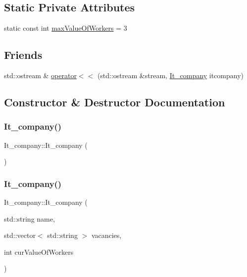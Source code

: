 \subsection*{Static Private Attributes}
\begin{DoxyCompactItemize}
\item 
static const int \hyperlink{class_it__company_ac71fd3642622747e9e543b5a193ba525}{max\+Value\+Of\+Workers} = 3
\end{DoxyCompactItemize}
\subsection*{Friends}
\begin{DoxyCompactItemize}
\item 
std\+::ostream \& \hyperlink{class_it__company_a962e1dda6d2c3075501e63a8d62693f7}{operator$<$$<$} (std\+::ostream \&stream, \hyperlink{class_it__company}{It\+\_\+company} itcompany)
\end{DoxyCompactItemize}


\subsection{Constructor \& Destructor Documentation}
\hypertarget{class_it__company_a586ce8103147bcb474965fbe92b029ae}{}\label{class_it__company_a586ce8103147bcb474965fbe92b029ae} 
\subsubsection{\texorpdfstring{It\+\_\+company()}{It\_company()}\hspace{0.1cm}{\footnotesize\ttfamily [1/3]}}
{\footnotesize\ttfamily It\+\_\+company\+::\+It\+\_\+company (\begin{DoxyParamCaption}{ }\end{DoxyParamCaption})\hspace{0.3cm}{\ttfamily [inline]}}

\hypertarget{class_it__company_aef3374e7fe0caae3e395e18418200112}{}\label{class_it__company_aef3374e7fe0caae3e395e18418200112} 
\subsubsection{\texorpdfstring{It\+\_\+company()}{It\_company()}\hspace{0.1cm}{\footnotesize\ttfamily [2/3]}}
{\footnotesize\ttfamily It\+\_\+company\+::\+It\+\_\+company (\begin{DoxyParamCaption}\item[{std\+::string}]{name,  }\item[{std\+::vector$<$ std\+::string $>$}]{vacancies,  }\item[{int}]{cur\+Value\+Of\+Workers }\end{DoxyParamCaption})\hspace{0.3cm}{\ttfamily [inline]}}

